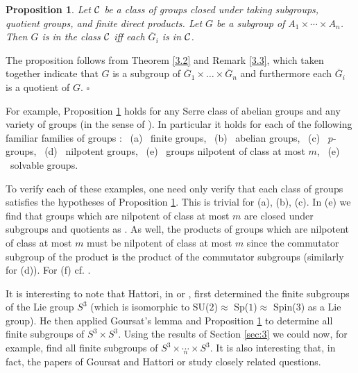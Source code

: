 \documentclass[11pt]{article}
\theoremstyle{change}
\newtheorem{Pro}[Thm]{Proposition}
\newcommand{\<}{\langle}
\renewcommand{\>}{\rangle}
\newcommand{\Proof} {\noindent{\itshape Proof.\quad }}
\newcommand{\qed}{\quad\hfill$\square$}
\begin{document}
    

    
    
\begin{Pro}\label{4.1}
Let ${\cal C}$ be a class of groups closed under taking subgroups, quotient groups, and finite
direct products. Let $G$ be a subgroup of $A_1\times\cdots\times A_n$. Then $G$ is in the class ${\cal C}$ iff each
$\overline{G}_i$ is in ${\cal C}$.

\end{Pro}

\Proof The proposition follows from Theorem \ref{3.2} and Remark \ref{3.3}, 
which taken together indicate that $G$ is a subgroup of 
$ \overline{G}_1 \times \ldots \times \overline{G}_n$ and furthermore each $\overline{G}_i$ is a quotient of $G$.
\qed

For example, Proposition \ref{4.1} holds for any Serre class of abelian groups and
any variety of groups (in the sense of \cite{Neumann}). In particular it holds
for each of the following familiar families of groups : \ (a) \ finite groups,
\ (b) \ abelian groups, \ (c) \ $p$-groups, \ (d) \ nilpotent groups, 
 \ (e) \ groups nilpotent of class at most $m$, \ (e) \ solvable groups.
 
  
%
To verify each of these examples, one need only verify that each class of groups satisfies the hypotheses of Proposition \ref{4.1}. This is trivial
for (a), (b), (c).   In (e) we find that groups which are nilpotent of class at most $m$ are closed under subgroups and quotients as \cite[Theorem 5.35, 5.36]{Rotman}.  As well,  the products of groups which are nilpotent of class at most $m$ must be nilpotent of class at most $m$ since the commutator subgroup of the product is the product of the commutator subgroups (similarly for (d)). For (f)
cf. \cite[Theorems 6.11, 6.12, and Corollary 6.14]{Rotman}.


It is interesting to note that Hattori, in \cite{Hattori} or \cite{Z}, first determined the finite subgroups of the Lie group $S^3$ (which is isomorphic to SU($2$)$\approx$ Sp($1$)$\approx$ Spin($3$) as a Lie group). He then applied Goursat's lemma and Proposition \ref{4.1} to determine all finite subgroups of $S^3\times S^3$. Using the results of Section \ref{sec:3} we could now, for example, find all finite subgroups of $S^3\times \underset{n}{\cdots}\times S^3$.  It is also interesting that, in fact, the  papers of Goursat \cite{Goursat} and Hattori \cite{Hattori} or \cite{Z} study closely related questions.
\end{document}
